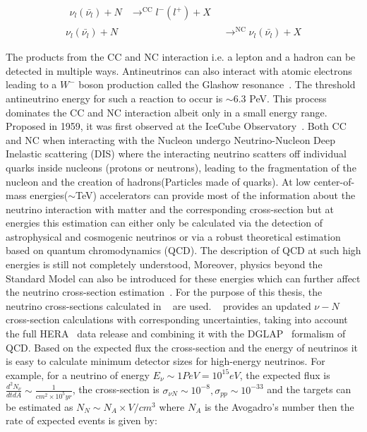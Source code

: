 \begin{subequations}\label{eq:NuCC_NC}
  \begin{align}
    \begin{split}
      \nu_l(\bar{\nu_l}) + N &\mathop{\longrightarrow}^{\mathrm{CC}} l^-(l^+) + X 
    \end{split} \\
    \nu_l(\bar{\nu_l}) + N &\mathop{\longrightarrow}^{\mathrm{NC}} \nu_l(\bar{\nu_l}) + X
  \end{align}
\end{subequations}

The products from the CC and NC interaction i.e. a lepton and a hadron can be detected in multiple ways. 
Antineutrinos can also interact with atomic electrons leading to a $W^-$ boson production called the Glashow resonance~\cite{PhysRev.118.316}. The threshold antineutrino energy for such a reaction to occur is $\sim$6.3 PeV. This process dominates the CC and NC interaction albeit only in a small energy range. Proposed in 1959, it was first observed at the IceCube Observatory~\cite{IceCube:2021rpz}. Both CC and NC when interacting with the Nucleon undergo Neutrino-Nucleon Deep Inelastic scattering (DIS) where the interacting neutrino scatters off individual quarks inside nucleons (protons or neutrons), leading to the fragmentation of the nucleon and the creation of hadrons(Particles made of quarks). At low center-of-mass energies($\sim$TeV) accelerators can provide most of the information about the neutrino interaction with matter and the corresponding cross-section but at energies this estimation can either only be calculated via the detection of astrophysical and cosmogenic neutrinos or via a robust theoretical estimation based on quantum chromodynamics (QCD). The description of QCD at such high energies is still not completely understood, Moreover, physics beyond the Standard Model can also be introduced for these energies which can further affect the neutrino cross-section estimation~\cite{PhysRevD.107.033009}. For the purpose of this thesis, the neutrino cross-sections calculated in ~\cite{Cooper_Sarkar_2011} are used. ~\cite{Cooper_Sarkar_2011} provides an updated $\nu -N$ cross-section calculations with corresponding uncertainties, taking into account the full HERA~\cite{aaron2010combined} data release and combining it with the DGLAP~\cite{ALTARELLI1977298,Dokshitzer:1977sg,Gribov:427157} formalism of QCD. Based on the expected flux the cross-section and the energy of neutrinos it is easy to calculate minimum detector sizes for high-energy neutrinos. For example, for a neutrino of energy $E_{\nu} \sim 1PeV = 10^{15} eV $, the expected flux is $\frac{d^2N_{\nu}}{dt dA} \sim \frac{1}{cm^2 \times 10^5 yr}$, the cross-section is $\sigma_{\nu N} \sim 10^{-8} , \sigma_{pp} \sim 10^{-33}$ and the targets can be estimated as $ N_N \sim N_A \times V/cm^3$ where $N_A$ is the Avogadro's number then the rate of expected events is given by:

